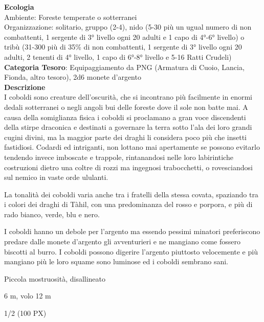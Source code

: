 \begin{multicols}{2}
{\textbf{Ecologia}\\
Ambiente: Foreste temperate o sotterranei\\
Organizzazione: solitario, gruppo (2-4), nido (5-30 più un ugual numero di non combattenti, 1 sergente di 3° livello ogni 20 adulti e 1 capo di 4°-6° livello) o tribù (31-300 più di 35\% di non combattenti, 1 sergente di 3° livello ogni 20 adulti, 2 tenenti di 4° livello, 1 capo di 6°-8° livello e 5-16 Ratti Crudeli)\\
\textbf{Categoria Tesoro}: Equipaggiamento da PNG (Armatura di Cuoio, Lancia, Fionda, altro tesoro), 2d6 monete d'argento\\
\textbf{Descrizione}\\
I coboldi sono creature dell'oscurità, che si incontrano più facilmente in enormi dedali sotterranei o negli angoli bui delle foreste dove il sole non batte mai. A causa della somiglianza fisica i coboldi si proclamano a gran voce discendenti della stirpe draconica e destinati a governare la terra sotto l'ala dei loro grandi cugini divini, ma la maggior parte dei draghi li considera poco più che insetti fastidiosi. Codardi ed intriganti, non lottano mai apertamente se possono evitarlo tendendo invece imboscate e trappole, rintanandosi nelle loro labirintiche costruzioni dietro una coltre di rozzi ma ingegnosi trabocchetti, o rovesciandosi sul nemico in vaste orde ululanti.

La tonalità dei coboldi varia anche tra i fratelli della stessa covata, spaziando tra i colori dei draghi di Tàhil, con una predominanza del rosso e porpora, e più di rado bianco, verde, blu e nero.

I coboldi hanno un debole per l'argento ma essendo pessimi minatori preferiscono predare dalle monete d'argento gli avventurieri e ne mangiano come fossero biscotti al burro. I coboldi possono digerire l'argento piuttosto velocemente e più mangiano più le loro squame sono luminose ed i coboldi sembrano sani.

\begin{description}[noitemsep, topsep=0pt, parsep=0pt, partopsep=0pt, itemsep=1pt, leftmargin=2.35cm,  labelwidth=2.2cm, itemindent=0cm, listparindent=0pt] %
\setlength{\baselineskip}{10pt}
\item[\textbf{Taglia/Tipo}] Piccola mostruosità, disallineato
\item[\textbf{Caratt.}] 
\item[\textbf{Punti Ferita}] 
\item[\textbf{Movimento}] 6 m, volo 12 m
\item[\textbf{Tiri Salvez.}] 
\item[\textbf{Sensi}] 
\item[\textbf{Sfida}] 1/2 (100 PX)
\end{description}
\smallskip

}
\end{multicols}
